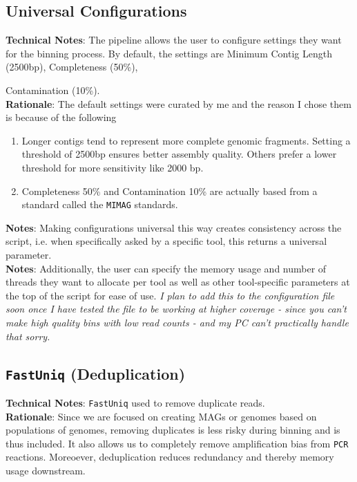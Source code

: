 \documentclass[11pt]{report}
\begin{document}
\subsection{Universal Configurations}
\textbf{Technical Notes}: The pipeline allows the user to configure settings they want for the binning process. By default, the settings are Minimum Contig Length (2500bp), Completeness (50\%), {Contamination (10\%). \\
\textbf{Rationale}: The default settings were curated by me and the reason I chose them is because of the following
	\begin{enumerate}
		\item Longer contigs tend to represent more complete genomic fragments. Setting a threshold of 2500bp ensures better assembly quality. Others prefer a lower threshold for more sensitivity like 2000 bp.
		\item Completeness 50\% and Contamination 10\% are actually based from a standard called the \texttt{MIMAG} standards. 
	\end{enumerate} 
\textbf{Notes}: Making configurations universal this way creates consistency across the script, i.e. when specifically asked by a specific tool, this returns a universal parameter. \\
\textbf{Notes}: Additionally, the user can specify the memory usage and number of threads they want to allocate per tool as well as other tool-specific parameters at the top of the script for ease of use. \textit{I plan to add this to the configuration file soon once I have tested the file to be working at higher coverage - since you can't make high quality bins with low read counts - and my PC can't practically handle that sorry.}


\subsection{\texttt{FastUniq} (Deduplication)}
\textbf{Technical Notes}: \texttt{FastUniq} used to remove duplicate reads. \\
\textbf{Rationale}: Since we are focused on creating MAGs or genomes based on populations of genomes, removing duplicates is less risky during binning and is thus included. It also allows us to completely remove amplification bias from \texttt{PCR} reactions. Moreoever, deduplication reduces redundancy and thereby memory usage downstream.\\

}
\end{document}
